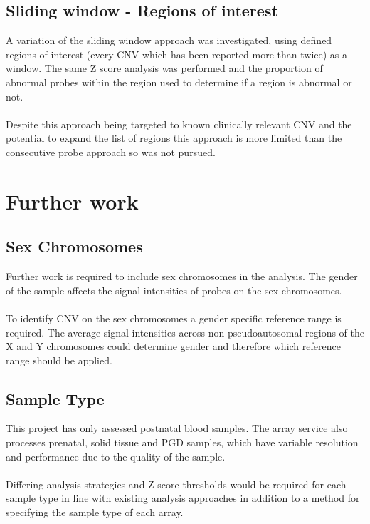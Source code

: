 \subsection{Sliding window - Regions of interest}
A variation of the sliding window approach was investigated, using defined regions of interest (every CNV which has been reported more than twice) as a window. The same Z score analysis was performed and the proportion of abnormal probes within the region used to determine if a region is abnormal or not.
\paragraph*{}
Despite this approach being targeted to known clinically relevant CNV and the potential to expand the list of regions this approach is more limited than the consecutive probe approach so was not pursued.

\section{Further work}
\subsection{Sex Chromosomes}
Further work is required to include sex chromosomes in the analysis. The gender of the sample affects the signal intensities of probes on the sex chromosomes. 
\paragraph*{}
To identify CNV on the sex chromosomes a gender specific reference range is required. The average signal intensities across non pseudoautosomal regions of the X and Y chromosomes could determine gender and therefore which reference range should be applied.
\subsection{Sample Type}
This project has only assessed postnatal blood samples. The array service also processes prenatal, solid tissue and \ac{PGD} samples, which have variable resolution and performance due to the quality of the sample. 
\paragraph*{}
Differing analysis strategies and Z score thresholds would be required for each sample type in line with existing analysis approaches in addition to a method for specifying the sample type of each array.
